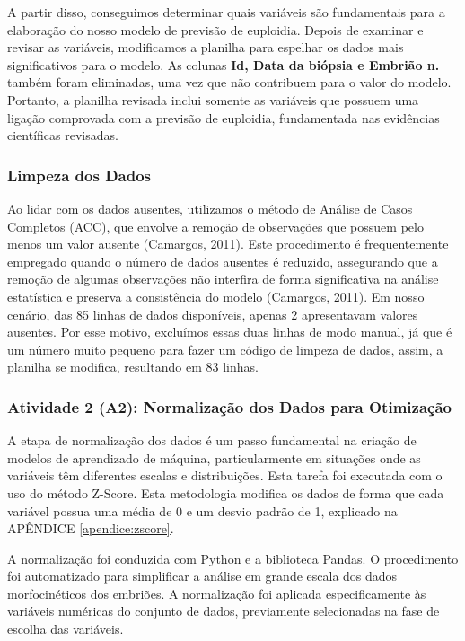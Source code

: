 A partir disso, conseguimos determinar quais variáveis são fundamentais para a elaboração do nosso modelo de previsão de euploidia. Depois de examinar e revisar as variáveis, modificamos a planilha para espelhar os dados mais significativos para o modelo. As colunas \textbf{Id, Data da biópsia e Embrião n.} também foram eliminadas, uma vez que não contribuem para o valor do modelo. Portanto, a planilha revisada inclui somente as variáveis que possuem uma ligação comprovada com a previsão de euploidia, fundamentada nas evidências científicas revisadas.

\subsubsection{Limpeza dos Dados}
Ao lidar com os dados ausentes, utilizamos o método de Análise de Casos Completos (ACC), que envolve a remoção de observações que possuem pelo menos um valor ausente (Camargos, 2011). Este procedimento é frequentemente empregado quando o número de dados ausentes é reduzido, assegurando que a remoção de algumas observações não interfira de forma significativa na análise estatística e preserva a consistência do modelo (Camargos, 2011). Em nosso cenário, das 85 linhas de dados disponíveis, apenas 2 apresentavam valores ausentes. Por esse motivo, excluímos essas duas linhas de modo manual, já que é um número muito pequeno para fazer um código de limpeza de dados, assim, a planilha se modifica, resultando em 83 linhas.

\subsubsection{Atividade 2 (A2): Normalização dos Dados para Otimização}
A etapa de normalização dos dados é um passo fundamental na criação de modelos de aprendizado de máquina, particularmente em situações onde as variáveis têm diferentes escalas e distribuições. Esta tarefa foi executada com o uso do método Z-Score. Esta metodologia modifica os dados de forma que cada variável possua uma média de 0 e um desvio padrão de 1, explicado na APÊNDICE \ref{apendice:zscore}. 

A normalização foi conduzida com Python e a biblioteca Pandas. O procedimento foi automatizado para simplificar a análise em grande escala dos dados morfocinéticos dos embriões. A normalização foi aplicada especificamente às variáveis numéricas do conjunto de dados, previamente selecionadas na fase de escolha das variáveis. 

